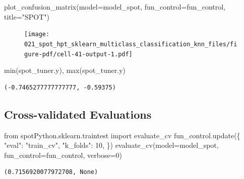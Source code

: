 \documentclass[
  letterpaper,
  DIV=11,
  numbers=noendperiod]{scrreprt}
\newenvironment{Shaded}{\begin{snugshade}}{\end{snugshade}}
\newcommand{\BuiltInTok}[1]{\textcolor[rgb]{0.00,0.23,0.31}{#1}}
\newcommand{\DecValTok}[1]{\textcolor[rgb]{0.68,0.00,0.00}{#1}}
\newcommand{\ImportTok}[1]{\textcolor[rgb]{0.00,0.46,0.62}{#1}}
\newcommand{\NormalTok}[1]{\textcolor[rgb]{0.00,0.23,0.31}{#1}}
\newcommand{\OperatorTok}[1]{\textcolor[rgb]{0.37,0.37,0.37}{#1}}
\newcommand{\StringTok}[1]{\textcolor[rgb]{0.13,0.47,0.30}{#1}}
\begin{document}
\begin{Shaded}
\begin{Highlighting}[]
\NormalTok{plot\_confusion\_matrix(model}\OperatorTok{=}\NormalTok{model\_spot, fun\_control}\OperatorTok{=}\NormalTok{fun\_control, title}\OperatorTok{=}\StringTok{"SPOT"}\NormalTok{)}
\end{Highlighting}
\end{Shaded}

\begin{figure}[H]

{\centering \texttt{[image: 021\_spot\_hpt\_sklearn\_multiclass\_classification\_knn\_files/figure-pdf/cell-41-output-1.pdf]}

}

\end{figure}

\begin{Shaded}
\begin{Highlighting}[]
\BuiltInTok{min}\NormalTok{(spot\_tuner.y), }\BuiltInTok{max}\NormalTok{(spot\_tuner.y)}
\end{Highlighting}
\end{Shaded}

\begin{verbatim}
(-0.7465277777777777, -0.59375)
\end{verbatim}

\hypertarget{cross-validated-evaluations-3}{%
\subsection{Cross-validated
Evaluations}\label{cross-validated-evaluations-3}}

\begin{Shaded}
\begin{Highlighting}[]
\ImportTok{from}\NormalTok{ spotPython.sklearn.traintest }\ImportTok{import}\NormalTok{ evaluate\_cv}
\NormalTok{fun\_control.update(\{}
     \StringTok{"eval"}\NormalTok{: }\StringTok{"train\_cv"}\NormalTok{,}
     \StringTok{"k\_folds"}\NormalTok{: }\DecValTok{10}\NormalTok{,}
\NormalTok{\})}
\NormalTok{evaluate\_cv(model}\OperatorTok{=}\NormalTok{model\_spot, fun\_control}\OperatorTok{=}\NormalTok{fun\_control, verbose}\OperatorTok{=}\DecValTok{0}\NormalTok{)}
\end{Highlighting}
\end{Shaded}

\begin{verbatim}
(0.7156920077972708, None)
\end{verbatim}
\end{document}
